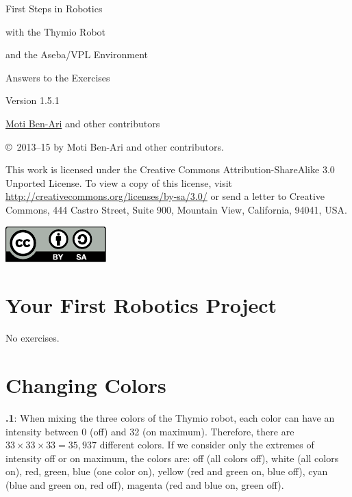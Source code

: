 \documentclass[11pt,a4paper,english]{article}
\begin{document}
\thispagestyle{empty}

\begin{center}
\begin{bfseries}

\begin{Large}
First Steps in Robotics

with the
Thymio Robot

and the
Aseba/VPL Environment

\bigskip

Answers to the Exercises

\end{Large}

Version 1.5.1

\bigskip

\href{http://www.weizmann.ac.il/sci-tea/benari/}{Moti Ben-Ari} and other contributors

\end{bfseries}
\end{center}

\bigskip

\copyright{}\  2013--15 by Moti Ben-Ari and other contributors.

This work is licensed under the Creative Commons
Attribution-ShareAlike 3.0 Unported License. To view a copy
of this license, visit
\url{http://creativecommons.org/licenses/by-sa/3.0/}
or send a letter to Creative Commons, 444 Castro Street, Suite 900,
Mountain View, California, 94041, USA.

\begin{center}
\hspace{6pt}\includegraphics[width=.2\textwidth]{../images/by-sa}
\end{center}

\section{Your First Robotics Project}

No exercises.

\section{Changing Colors}

\textbf{\thesection.1}: 
When mixing the three colors of the Thymio robot, each color can have
an intensity between 0 (off) and 32 (on maximum). Therefore, there are
$33 \times 33 \times 33=35,937$ different colors. If we consider only
the extremes of intensity off or on maximum, the colors are: off (all
colors off), white (all colors on), red, green, blue (one color on),
yellow (red and green on, blue off), cyan (blue and green on, red off),
magenta (red and blue on, green off).
\end{document}

